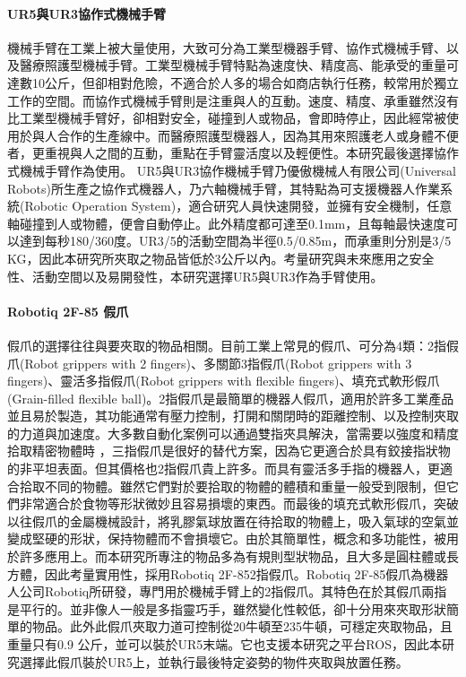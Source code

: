 \paragraph{UR5與UR3協作式機械手臂}
機械手臂在工業上被大量使用，大致可分為工業型機器手臂、協作式機械手臂、以及醫療照護型機械手臂。工業型機械手臂特點為速度快、精度高、能承受的重量可達數10公斤，但卻相對危險，不適合於人多的場合如商店執行任務，較常用於獨立工作的空間。而協作式機械手臂則是注重與人的互動。速度、精度、承重雖然沒有比工業型機械手臂好，卻相對安全，碰撞到人或物品，會即時停止，因此經常被使用於與人合作的生產線中。而醫療照護型機器人，因為其用來照護老人或身體不便者，更重視與人之間的互動，重點在手臂靈活度以及輕便性。本研究最後選擇協作式機械手臂作為使用。
UR5與UR3協作機械手臂乃優傲機械人有限公司(Universal Robots)所生產之協作式機器人，乃六軸機械手臂，其特點為可支援機器人作業系統(Robotic Operation System)，適合研究人員快速開發，並擁有安全機制，任意軸碰撞到人或物體，便會自動停止。此外精度都可達至0.1mm，且每軸最快速度可以達到每秒180/360度。UR3/5的活動空間為半徑0.5/0.85m，而承重則分別是3/5 KG，因此本研究所夾取之物品皆低於3公斤以內。考量研究與未來應用之安全性、活動空間以及易開發性，本研究選擇UR5與UR3作為手臂使用。


\paragraph{Robotiq 2F-85 假爪}
假爪的選擇往往與要夾取的物品相關。目前工業上常見的假爪、可分為4類：2指假爪(Robot grippers with 2 fingers)、多關節3指假爪(Robot grippers with 3 fingers)、靈活多指假爪(Robot grippers with flexible fingers)、填充式軟形假爪(Grain-filled flexible ball)。2指假爪是最簡單的機器人假爪，適用於許多工業產品並且易於製造，其功能通常有壓力控制，打開和關閉時的距離控制、以及控制夾取的力道與加速度。大多數自動化案例可以通過雙指夾具解決，當需要以強度和精度拾取精密物體時
，三指假爪是很好的替代方案，因為它更適合於具有鉸接指狀物的非平坦表面。但其價格也2指假爪貴上許多。而具有靈活多手指的機器人，更適合拾取不同的物體。雖然它們對於要拾取的物體的體積和重量一般受到限制，但它們非常適合於食物等形狀微妙且容易損壞的東西。而最後的填充式軟形假爪，突破以往假爪的金屬機械設計，將乳膠氣球放置在待拾取的物體上，吸入氣球的空氣並變成堅硬的形狀，保持物體而不會損壞它。由於其簡單性，概念和多功能性，被用於許多應用上。而本研究所專注的物品多為有規則型狀物品，且大多是圓柱體或長方體，因此考量實用性，採用Robotiq 2F-852指假爪。Robotiq 2F-85假爪為機器人公司Robotiq所研發，專門用於機械手臂上的2指假爪。其特色在於其假爪兩指是平行的。並非像人一般是多指靈巧手，雖然變化性較低，卻十分用來夾取形狀簡單的物品。此外此假爪夾取力道可控制從20牛頓至235牛頓，可穩定夾取物品，且重量只有0.9 公斤，並可以裝於UR5末端。它也支援本研究之平台ROS，因此本研究選擇此假爪裝於UR5上，並執行最後特定姿勢的物件夾取與放置任務。


